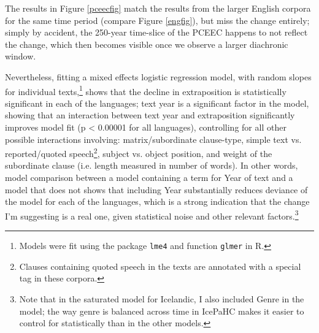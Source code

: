 \noindent The results in Figure \ref{pceecfig} match the results from the larger English corpora for the same time period (compare Figure \ref{engfig}), but miss the change entirely; simply by accident, the 250-year time-slice of the PCEEC happens to not reflect the change, which then becomes visible once we observe a larger diachronic window.

Nevertheless, fitting a mixed effects logistic regression model, with random slopes for individual texts,\footnote{Models were fit using the package \texttt{lme4} and function \texttt{glmer} in R.} shows that the decline in extraposition is statistically significant in each of the languages; text year is a significant factor in the model, showing that an interaction between text year and extraposition significantly improves model fit (p < 0.00001 for all languages), controlling for all other possible interactions involving: matrix/subordinate clause-type, simple text vs. reported/quoted speech\footnote{Clauses containing quoted speech in the texts are annotated with a special tag in these corpora.}, subject vs. object position, and weight of the subordinate clause (i.e. length measured in number of words). In other words, model comparison between a model containing a term for Year of text and a model that does not shows that including Year substantially reduces deviance of the model for each of the languages, which is a strong indication that the change I'm suggesting is a real one, given statistical noise and other relevant factors.\footnote{Note that in the saturated model for Icelandic, I also included Genre in the model; the way genre is balanced across time in IcePaHC makes it easier to control for statistically than in the other models.}


